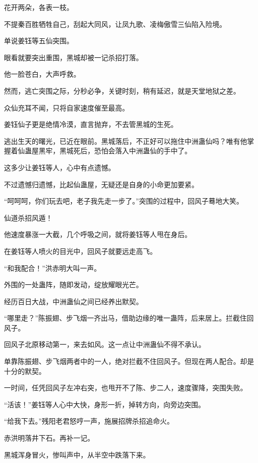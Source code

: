 
\begin{this_body}

花开两朵，各表一枝。

不提秦百胜牺牲自己，刮起大同风，让凤九歌、凌梅傲雪三仙陷入险境。

单说姜钰等五仙突围。

眼看就要突出重围，黑城却被一记杀招打落。

他一脸苍白，大声呼救。

然而，逃亡突围之际，分秒必争，关键时刻，稍有延迟，就是天堂地狱之差。

众仙充耳不闻，只将自家速度催至最高。

姜钰仙子更是绝情冷漠，直言抛弃，不去管黑城的生死。

逃出生天的曙光，已近在眼前。黑城落后，不正好可以拖住中洲蛊仙吗？唯有他掌握着仙蛊屋黑牢，黑城死后，恐怕会落入中洲蛊仙的手中了。

这多少让姜钰等人，心中有点遗憾。

不过遗憾归遗憾，比起仙蛊屋，无疑还是自身的小命更加要紧。

“呵呵呵，你们玩去吧，老子我先走一步了。”突围的过程中，回风子蓦地大笑。

仙道杀招风遁！

他速度暴涨一大截，几个呼吸之间，就将姜钰等人甩在身后。

在姜钰等人喷火的目光中，回风子就要远走高飞。

“和我配合！”洪赤明大叫一声。

外围的一处蛊阵，随即发动，绽放耀眼光芒。

经历百日大战，中洲蛊仙之间已经养出默契。

“哪里走？”陈振翅、步飞烟一齐出马，借助边缘的唯一蛊阵，后来居上。拦截住回风子。

回风子北原移动第一，来去如风。这一点让中洲蛊仙不得不承认。

单靠陈振翅、步飞烟两者中的一人，绝对拦截不住回风子。但现在两人配合。却是十分的默契。

一时间，任凭回风子左冲右突，也甩开不了陈、步二人，速度骤降，突围失败。

“活该！”姜钰等人心中大快，身形一折，掉转方向，向旁边突围。

“给我下去。”残阳老君怒哼一声，施展招牌杀招追命火。

赤洪明落井下石。再补一记。

黑城浑身冒火，惨叫声中，从半空中跌落下来。


\end{this_body}
